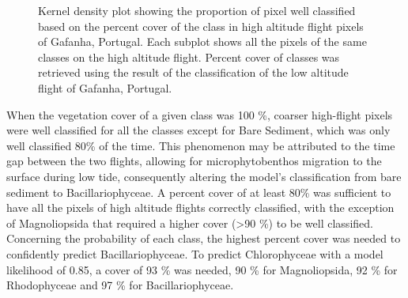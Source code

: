 \documentclass[
  number]{elsarticle}
\begin{document}
\label{cell-fig-upscaling}
\begin{figure}[H]


\caption{\label{fig-upscaling}Kernel density plot showing the proportion
of pixel well classified based on the percent cover of the class in high
altitude flight pixels of Gafanha, Portugal. Each subplot shows all the
pixels of the same classes on the high altitude flight. Percent cover of
classes was retrieved using the result of the classification of the low
altitude flight of Gafanha, Portugal.}

\end{figure}%

When the vegetation cover of a given class was 100 \%, coarser
high-flight pixels were well classified for all the classes except for
Bare Sediment, which was only well classified 80\% of the time. This
phenomenon may be attributed to the time gap between the two flights,
allowing for microphytobenthos migration to the surface during low tide,
consequently altering the model's classification from bare sediment to
Bacillariophyceae. A percent cover of at least 80\% was sufficient to
have all the pixels of high altitude flights correctly classified, with
the exception of Magnoliopsida that required a higher cover
(\textgreater90 \%) to be well classified. Concerning the probability of
each class, the highest percent cover was needed to confidently predict
Bacillariophyceae. To predict Chlorophyceae with a model likelihood of
0.85, a cover of 93 \% was needed, 90 \% for Magnoliopsida, 92 \% for
Rhodophyceae and 97 \% for Bacillariophyceae.
\end{document}
